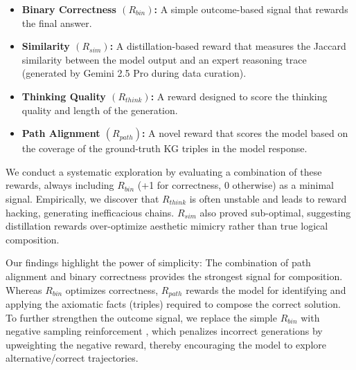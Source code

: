\documentclass{article}
\theoremstyle{plain}
\theoremstyle{definition}
\theoremstyle{remark}
\begin{document}
\begin{itemize}
    \item \textbf{Binary Correctness $(R_{bin})$:} A simple outcome-based signal that rewards the final answer. 
    \item \textbf{Similarity $(R_{sim})$:} A distillation-based reward that measures the Jaccard similarity between the model output and an expert reasoning trace (generated by Gemini 2.5 Pro during data curation).
    \item \textbf{Thinking Quality $(R_{think})$:} A reward designed to score the thinking quality and length of the generation.
    \item \textbf{Path Alignment $(R_{path})$:} A novel reward that scores the model based on the coverage of the ground-truth KG triples in the model response.
\end{itemize}





We conduct a systematic exploration by evaluating a combination of these rewards, always including $R_{bin}$ (+1 for correctness, 0 otherwise) as a minimal signal. Empirically, we discover that $R_{think}$ is often unstable and leads to reward hacking, generating inefficacious chains. $R_{sim}$ also proved sub-optimal, suggesting distillation rewards over-optimize aesthetic mimicry rather than true logical composition. 

Our findings highlight the power of simplicity: The combination of path alignment and binary correctness provides the strongest signal for composition. Whereas $R_{bin}$ optimizes correctness, $R_{path}$ rewards the model for identifying and applying the axiomatic facts (triples) required to compose the correct solution. To further strengthen the outcome signal, we replace the simple $R_{bin}$ with negative sampling reinforcement \cite{Zhu2025}, which penalizes incorrect generations by upweighting the negative reward, thereby encouraging the model to explore alternative/correct trajectories.
\end{document}
